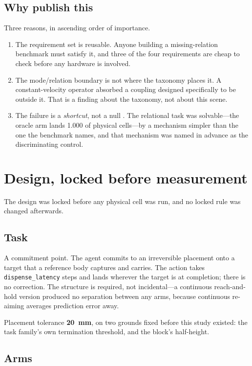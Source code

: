 \documentclass[10pt]{article}
\begin{document}
\subsection{Why publish this}

Three reasons, in ascending order of importance.

\begin{enumerate}[leftmargin=*]
\item The requirement set is reusable. Anyone building a missing-relation
benchmark must satisfy it, and three of the four requirements are cheap to check
before any hardware is involved.
\item The mode/relation boundary is not where the taxonomy places it. A
constant-velocity operator absorbed a coupling designed specifically to be
outside it. That is a finding about the taxonomy, not about this scene.
\item The failure is a \emph{shortcut}, not a null
\citep{geirhos2020shortcut}. The relational task was solvable---the oracle arm
lands 1.000 of physical cells---by a mechanism simpler than the one the benchmark
names, and that mechanism was named in advance as the discriminating control.
\end{enumerate}

\section{Design, locked before measurement}

The design was locked before any physical cell was run, and no locked rule was
changed afterwards.

\subsection{Task}

A commitment point. The agent commits to an irreversible placement onto a target
that a reference body captures and carries. The action takes
\texttt{dispense\_latency} steps and lands wherever the target is at completion;
there is no correction. The structure is required, not incidental---a continuous
reach-and-hold version produced no separation between any arms, because
continuous re-aiming averages prediction error away.

Placement tolerance \textbf{20~mm}, on two grounds fixed before this study
existed: the task family's own termination threshold, and the block's
half-height.

\subsection{Arms}
\end{document}
